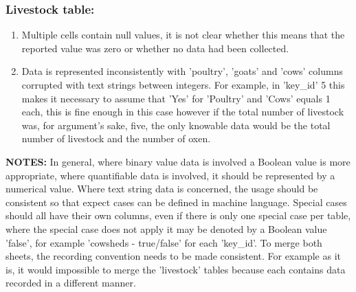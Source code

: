 \documentclass{article}
\begin{document}
\begin{enumerate}
    \subsubsection{Livestock table:}
    \begin{enumerate}
        \item Multiple cells contain null values, it is not clear whether this means that the reported value was zero or whether no data had been collected.
        \item Data is represented inconsistently with 'poultry', 'goats' and 'cows' columns corrupted with text strings between integers. For example, in 'key\_id' 5 this makes it necessary to assume that 'Yes' for 'Poultry' and 'Cows' equals 1 each, this is fine enough in this case however if the total number of livestock was, for argument's sake, five, the only knowable data would be the total number of livestock and the number of oxen.
    \end{enumerate}
    \textbf{NOTES:} In general, where binary value data is involved a Boolean value is more appropriate, where quantifiable data is involved, it should be represented by a numerical value. Where text string data is concerned, the usage should be consistent so that expect cases can be defined in machine language. Special cases should all have their own columns, even if there is only one special case per table, where the special case does not apply it may be denoted by a Boolean value 'false', for example 'cowsheds - true/false' for each 'key\_id'. To merge both sheets, the recording convention needs to be made consistent. For example as it is, it would impossible to merge the 'livestock' tables because each contains data recorded in a different manner.
\end{enumerate}
\end{document}
